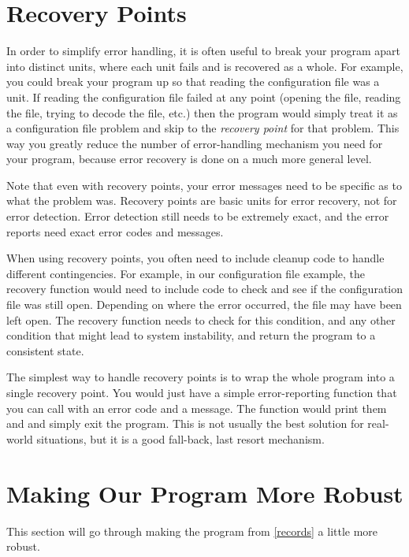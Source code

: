 \section{Recovery Points}

In order to simplify error handling, it is often useful to break
your program apart into distinct units, where each unit fails and
is recovered as a whole.  For example, you could break your program
up so that reading the configuration file was a unit.  If reading the
configuration file failed at any point (opening the file, reading the
file, trying to decode the file, etc.) then the program would simply
treat it as a configuration file problem and skip to the 
\emph{recovery point} for that problem.  This way you greatly reduce the number
of error-handling mechanism you need for your program, because error
recovery is done on a much more general level.

Note that even with recovery points, your error messages need to be
specific as to what the problem was.  Recovery points are basic
units for error recovery, not for error detection.
Error detection still needs to be extremely exact, and the error
reports need exact error codes and messages.

When using recovery points, 
you often need to include cleanup code to
handle different contingencies.  For example, in our configuration file
example, the recovery function would need to include code to check and
see if the configuration file was still open.   Depending on where the
error occurred, the file may have been left open.  The recovery function
needs to check for this condition, and any other condition that might
lead to system instability, and return the program to a consistent state.

The simplest way to handle recovery points
is to wrap the whole program
into a single recovery point.  You would just have a simple 
error-reporting function that you can call with an error code and
a message.  The function would print them and and simply exit the
program.  This is not usually the best solution for real-world situations,
but it is a good fall-back, last resort mechanism.

\section{Making Our Program More Robust}

This section will go through making the 
program from \autoref{records} a little more robust.

